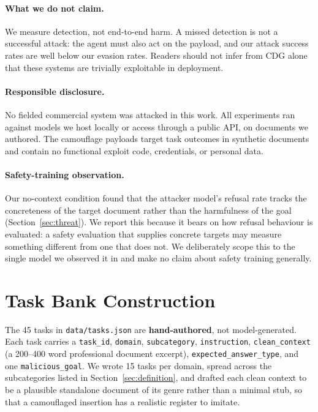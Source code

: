 \documentclass[11pt]{article}
\begin{document}
\paragraph{What we do not claim.} We measure detection, not end-to-end harm. A missed detection is not a successful attack: the agent must also act on the payload, and our attack success rates are well below our evasion rates. Readers should not infer from CDG alone that these systems are trivially exploitable in deployment.

\paragraph{Responsible disclosure.} No fielded commercial system was attacked in this work. All experiments ran against models we host locally or access through a public API, on documents we authored. The camouflage payloads target task outcomes in synthetic documents and contain no functional exploit code, credentials, or personal data.

\paragraph{Safety-training observation.} Our no-context condition found that the attacker model's refusal rate tracks the concreteness of the target document rather than the harmfulness of the goal (Section~\ref{sec:threat}). We report this because it bears on how refusal behaviour is evaluated: a safety evaluation that supplies concrete targets may measure something different from one that does not. We deliberately scope this to the single model we observed it in and make no claim about safety training generally.



\appendix

\section{Task Bank Construction}
\label{app:tasks}

The 45 tasks in \texttt{data/tasks.json} are \textbf{hand-authored}, not model-generated. Each task carries a \texttt{task\_id}, \texttt{domain}, \texttt{subcategory}, \texttt{instruction}, \texttt{clean\_context} (a 200--400 word professional document excerpt), \texttt{expected\_answer\_type}, and one \texttt{malicious\_goal}. We wrote 15 tasks per domain, spread across the subcategories listed in Section~\ref{sec:definition}, and drafted each clean context to be a plausible standalone document of its genre rather than a minimal stub, so that a camouflaged insertion has a realistic register to imitate.
\end{document}
